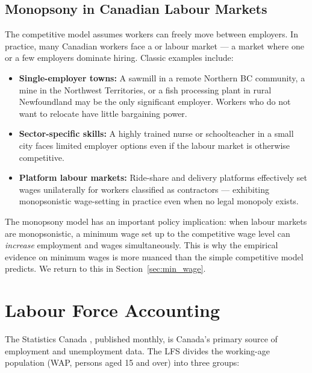 \subsection{Monopsony in Canadian Labour Markets}

The competitive model assumes workers can freely move between employers.
In practice, many Canadian workers face a  or
 labour market --- a market where one or a few employers
dominate hiring. Classic examples include:

\begin{itemize}
  \item \textbf{Single-employer towns:} A sawmill in a remote Northern BC
        community, a mine in the Northwest Territories, or a fish processing
        plant in rural Newfoundland may be the only significant employer.
        Workers who do not want to relocate have little bargaining power.
  \item \textbf{Sector-specific skills:} A highly trained nurse or
        schoolteacher in a small city faces limited employer options
        even if the labour market is otherwise competitive.
  \item \textbf{Platform labour markets:} Ride-share and delivery platforms
        effectively set wages unilaterally for workers classified as
        contractors --- exhibiting monopsonistic wage-setting in practice
        even when no legal monopoly exists.
\end{itemize}

The monopsony model has an important policy implication: when labour markets
are monopsonistic, a minimum wage set up to the competitive wage level can
\textit{increase} employment and wages simultaneously. This is why the
empirical evidence on minimum wages is more nuanced than the simple
competitive model predicts. We return to this in Section~\ref{sec:min_wage}.

\section{Labour Force Accounting}
\label{sec:labour_accounting}

The Statistics Canada , published monthly,
is Canada's primary source of employment and unemployment data. The LFS
divides the working-age population (WAP, persons aged 15 and over) into
three groups:

